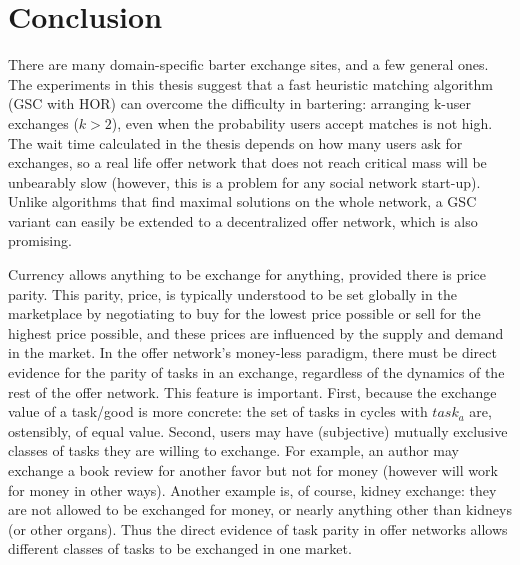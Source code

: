 \documentclass[main.tex]{subfiles}
\begin{document}
\section{Conclusion}
There are many domain-specific barter exchange sites, and a few general ones. The experiments in this thesis suggest that a fast heuristic matching algorithm (GSC with HOR) can overcome the difficulty in bartering: arranging k-user exchanges ($k > 2$), even when the probability users accept matches is not high. The wait time calculated in the thesis depends on how many users ask for exchanges, so a real life offer network that does not reach critical mass will be unbearably slow (however, this is a problem for any social network start-up). Unlike algorithms that find maximal solutions on the whole network, a GSC variant can easily be extended to a decentralized offer network, which is also promising.

Currency allows anything to be exchange for anything, provided there is price parity. This parity, price, is typically understood to be set globally in the marketplace by negotiating to buy for the lowest price possible or sell for the highest price possible, and these prices are influenced by the supply and demand in the market. In the offer network's money-less paradigm, there must be direct evidence for the parity of tasks in an exchange, regardless of the dynamics of the rest of the offer network. This feature is important. First, because the exchange value of a task/good is more concrete: the set of tasks in cycles with $task_a$ are, ostensibly, of equal value. Second, users may have (subjective) mutually exclusive classes of tasks they are willing to exchange. For example, an author may exchange a book review for another favor but not for money (however will work for money in other ways). Another example is, of course, kidney exchange: they are not allowed to be exchanged for money, or nearly anything other than kidneys (or other organs). Thus the direct evidence of task parity in offer networks allows different classes of tasks to be exchanged in one market.
\end{document}
